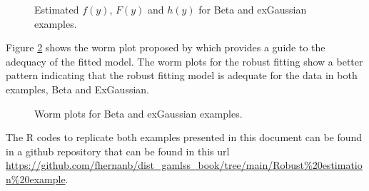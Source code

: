 \documentclass{article}
\begin{document}
\begin{figure}[htp]
\centering
{}
\caption{\label{3plots_both_examples} Estimated $f(y)$, $F(y)$ and $h(y)$ for Beta and exGaussian examples.}
\end{figure}

Figure \ref{wp_both_examples} shows the worm plot proposed by \cite{buuren2001worm} which provides a guide to the adequacy of the fitted model. The worm plots for the robust fitting show a better pattern indicating that the robust fitting model is adequate for the data in both examples, Beta and ExGaussian.

\begin{figure}[htp]
\centering
{}
\caption{\label{wp_both_examples} Worm plots for Beta and exGaussian examples.}
\end{figure}

The R codes to replicate both examples presented in this document can be found in a github repository that can be found in this url \url{https://github.com/fhernanb/dist_gamlss_book/tree/main/Robust%20estimation%20example}.
    

\end{document}
